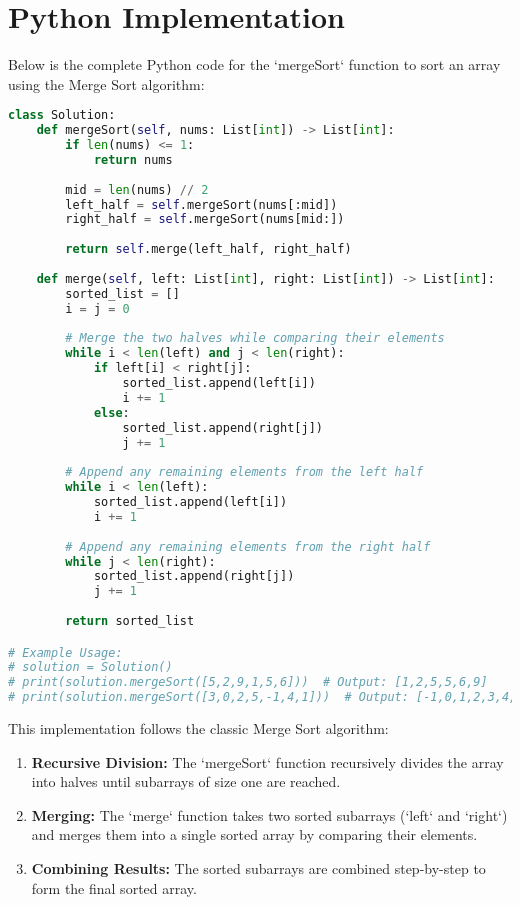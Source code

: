 \newpage %
\section*{Python Implementation}

Below is the complete Python code for the `mergeSort` function to sort an array using the Merge Sort algorithm:

\begin{fullwidth}
\begin{lstlisting}[language=Python]
class Solution:
    def mergeSort(self, nums: List[int]) -> List[int]:
        if len(nums) <= 1:
            return nums
        
        mid = len(nums) // 2
        left_half = self.mergeSort(nums[:mid])
        right_half = self.mergeSort(nums[mid:])
        
        return self.merge(left_half, right_half)
    
    def merge(self, left: List[int], right: List[int]) -> List[int]:
        sorted_list = []
        i = j = 0
        
        # Merge the two halves while comparing their elements
        while i < len(left) and j < len(right):
            if left[i] < right[j]:
                sorted_list.append(left[i])
                i += 1
            else:
                sorted_list.append(right[j])
                j += 1
        
        # Append any remaining elements from the left half
        while i < len(left):
            sorted_list.append(left[i])
            i += 1
        
        # Append any remaining elements from the right half
        while j < len(right):
            sorted_list.append(right[j])
            j += 1
        
        return sorted_list

# Example Usage:
# solution = Solution()
# print(solution.mergeSort([5,2,9,1,5,6]))  # Output: [1,2,5,5,6,9]
# print(solution.mergeSort([3,0,2,5,-1,4,1]))  # Output: [-1,0,1,2,3,4,5]
\end{lstlisting}
\end{fullwidth}

This implementation follows the classic Merge Sort algorithm:

\begin{enumerate}
    \item \textbf{Recursive Division:} The `mergeSort` function recursively divides the array into halves until subarrays of size one are reached.
    \item \textbf{Merging:} The `merge` function takes two sorted subarrays (`left` and `right`) and merges them into a single sorted array by comparing their elements.
    \item \textbf{Combining Results:} The sorted subarrays are combined step-by-step to form the final sorted array.
\end{enumerate}

